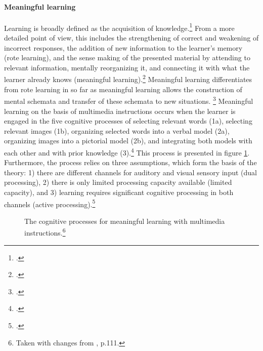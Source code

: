 \paragraph{Meaningful learning} Learning is broadly defined as the acquisition of knowledge.\footcites[Cf.][p.226]{MayerRotemeaningfullearning2002} From a more detailed point of view, this includes the strengthening of correct and weakening of incorrect responses, the addition of new information to the learner's memory (rote learning), and the sense making of the presented material by attending to relevant information, mentally reorganizing it, and connecting it with what the learner already knows (meaningful learning).\footcites[Cf.][chapter 2, paragraph 5]{ClarkElearningscienceinstruction2016} Meaningful learning differentiates from rote learning in so far as meaningful learning allows the construction of mental schemata and transfer of these schemata to new situations.%
\footcites[Cf.][p.227]{MayerRotemeaningfullearning2002}[cf.][p.299]{SwellerCognitiveloadtheory1994} Meaningful learning on the basis of multimedia instructions occurs when the learner is engaged in the five cognitive processes of selecting relevant words (1a), selecting relevant images (1b), organizing selected words into a verbal model (2a), organizing images into a pictorial model (2b), and integrating both models with each other and with prior knowledge (3).\footcites[Cf.][p.111]{MayerCognitiveTheoryMultimedia1999}[cf.][p.35]{SordenCognitiveTheoryMultimedia2012}[cf.][p.43]{MayerNineWaysReduce2003} This process is presented in figure \ref{fig:CTML_process}. Furthermore, the process relies on three assumptions, which form the basis of the theory: 1) there are different channels for auditory and visual sensory input (dual processing), 2) there is only limited processing capacity available (limited capacity), and 3) learning requires significant cognitive processing in both channels (active processing).\footcites[Cf.][p.44]{MayerNineWaysReduce2003}

\begin{figure}
    \centering
    
    \caption[The cognitive processes for meaningful learning with multimedia instructions.]{The cognitive processes for meaningful learning with multimedia instructions.\footnote{Taken with changes from \cite{MayerCognitiveTheoryMultimedia1999}, p.111.}}
    \label{fig:CTML_process}
\end{figure}

